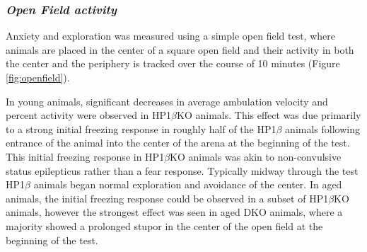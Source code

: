 \documentclass[onehalf,12pt]{beavtex}
\begin{document}
  \FloatBarrier
  
  \subsubsection*{\texorpdfstring{\emph{Open Field
  activity}}{Open Field activity}}\label{open-field-activity}
  
  Anxiety and exploration was measured using a simple open field test,
  where animals are placed in the center of a square open field and their
  activity in both the center and the periphery is tracked over the course
  of 10 minutes (Figure \ref{fig:openfield}).
  
  In young animals, significant decreases in average ambulation velocity
  and percent activity were observed in HP1\(\beta\)KO animals. This
  effect was due primarily to a strong initial freezing response in
  roughly half of the HP1\(\beta\) animals following entrance of the
  animal into the center of the arena at the beginning of the test. This
  initial freezing response in HP1\(\beta\)KO animals was akin to
  non-convulsive status epilepticus rather than a fear response. Typically
  midway through the test HP1\(\beta\) animals began normal exploration
  and avoidance of the center. In aged animals, the initial freezing
  response could be observed in a subset of HP1\(\beta\)KO animals,
  however the strongest effect was seen in aged DKO animals, where a
  majority showed a prolonged stupor in the center of the open field at
  the beginning of the test.
  
\end{document}

